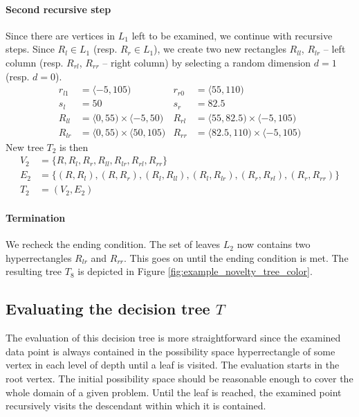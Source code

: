\begin{example}
\paragraph{Second recursive step}
    Since there are vertices in $L_1$ left to be examined, we continue with recursive steps.
    Since $R_l \in L_1$ (resp. $R_r \in L_1$), we create two new rectangles $R_{ll}$, $R_{lr}$ -- left column (resp. $R_{rl}$, $R_{rr}$ -- right column) by selecting a random dimension $d=1$ (resp. $d=0$).
    \begin{align*}
        r_{l1} &= \langle -5, 105)& r_{r0} &= \langle 55, 110) \\
        s_l &= 50 & s_r&=82.5\\
        R_{ll} &= \langle 0, 55) \times \langle -5,50) & R_{rl} &= \langle 55, 82.5) \times \langle -5,105)\\
        R_{lr} &= \langle 0, 55) \times \langle 50,105) & R_{rr} &= \langle 82.5, 110) \times \langle -5,105)
    \end{align*}
 New tree $T_2$ is then
    \begin{align*}
        V_2 &= \{R, R_l, R_r, R_{ll}, R_{lr}, R_{rl}, R_{rr}\} \\
        E_2 &= \{(R, R_l), (R, R_r), (R_l, R_{ll}), (R_l, R_{lr}), (R_r, R_{rl}), (R_r, R_{rr})\} \\
        T_2 &= (V_2, E_2)
    \end{align*}
\paragraph{Termination} We recheck the ending condition. The set of leaves $L_2$ now contains two hyperrectangles $R_{lr}$ and $R_{rr}$.
This goes on until the ending condition is met. The resulting tree $T_8$ is depicted in Figure \ref{fig:example_novelty_tree_color}.
\end{example}

\subsection{Evaluating the decision tree $T$}
The evaluation of this decision tree is more straightforward since the examined data point is always contained in the possibility space hyperrectangle of some vertex in each level of depth until a leaf is visited.
The evaluation starts in the root vertex. The initial possibility space should be reasonable enough to cover the whole domain of a given problem. Until the leaf is reached, the examined point recursively visits the descendant within which it is contained.



